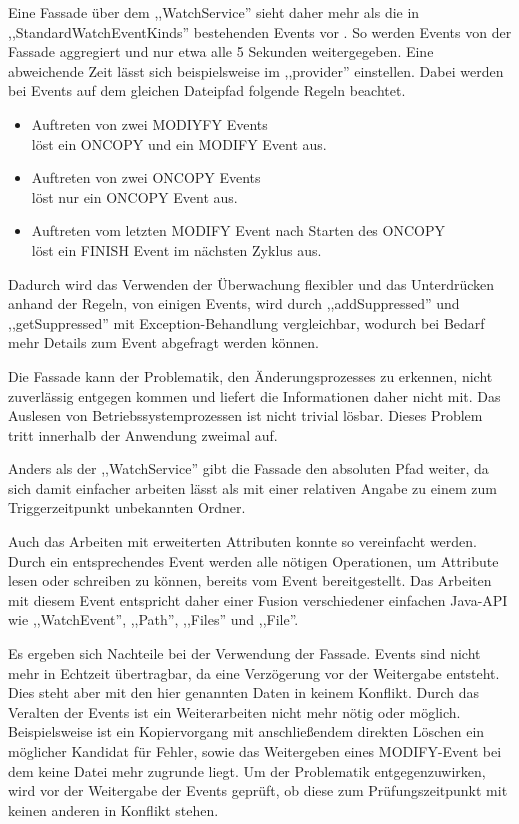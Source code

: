 \documentclass[oneside, ngerman, toc=bibliography,bibliography=totoc,listof=entryprefix, open=right,numbers=noenddot,fontsize=12pt]{scrbook}
\begin{document}
Eine Fassade  über dem ,,WatchService'' sieht daher mehr als die in  ,,StandardWatchEventKinds'' bestehenden Events vor \cite{gamma2011entwurfsmuster}. So werden Events von der Fassade aggregiert und nur etwa alle 5 Sekunden weitergegeben. Eine abweichende Zeit lässt sich beispielsweise im ,,provider'' einstellen. Dabei werden bei Events auf dem gleichen Dateipfad folgende Regeln beachtet.

\begin{itemize}
    \item Auftreten von zwei MODIYFY Events \\
    löst ein ONCOPY und ein MODIFY Event aus.
    \item Auftreten von zwei ONCOPY Events\\
    löst nur ein ONCOPY Event aus.
    \item Auftreten vom letzten MODIFY Event nach Starten des ONCOPY\\
    löst ein FINISH Event im nächsten Zyklus aus.
\end{itemize}

Dadurch wird das Verwenden der Überwachung flexibler und das Unterdrücken anhand der Regeln, von einigen Events, wird durch ,,addSuppressed'' und ,,getSuppressed'' mit Exception-Behandlung vergleichbar, wodurch bei Bedarf mehr Details zum Event abgefragt werden können.

Die Fassade kann der Problematik, den Änderungsprozesses zu erkennen, nicht zuverlässig entgegen kommen und liefert die Informationen daher nicht mit. Das Auslesen von Betriebssystemprozessen ist nicht trivial lösbar. Dieses Problem tritt innerhalb der Anwendung zweimal auf.

Anders als der ,,WatchService'' gibt die Fassade den absoluten Pfad weiter, da sich damit einfacher arbeiten lässt als mit einer relativen Angabe zu einem zum Triggerzeitpunkt unbekannten Ordner.

Auch das Arbeiten mit erweiterten Attributen konnte so vereinfacht werden.
Durch ein entsprechendes Event werden alle nötigen Operationen, um Attribute lesen oder schreiben zu können, bereits vom Event bereitgestellt. Das Arbeiten mit diesem Event entspricht daher einer Fusion verschiedener einfachen Java-API wie ,,WatchEvent'', ,,Path'', ,,Files'' und ,,File''.

Es ergeben sich Nachteile bei der Verwendung  der Fassade. Events sind nicht mehr in Echtzeit übertragbar, da eine Verzögerung vor der Weitergabe entsteht. Dies steht aber mit den hier genannten Daten in keinem Konflikt. Durch das Veralten der Events ist ein Weiterarbeiten nicht mehr nötig oder möglich. Beispielsweise ist ein Kopiervorgang mit anschließendem direkten Löschen ein möglicher Kandidat für Fehler, sowie das Weitergeben eines MODIFY-Event bei dem keine Datei mehr zugrunde liegt.
Um der Problematik entgegenzuwirken, wird vor der Weitergabe der Events geprüft, ob diese zum Prüfungszeitpunkt mit keinen anderen in Konflikt stehen.
\end{document}
